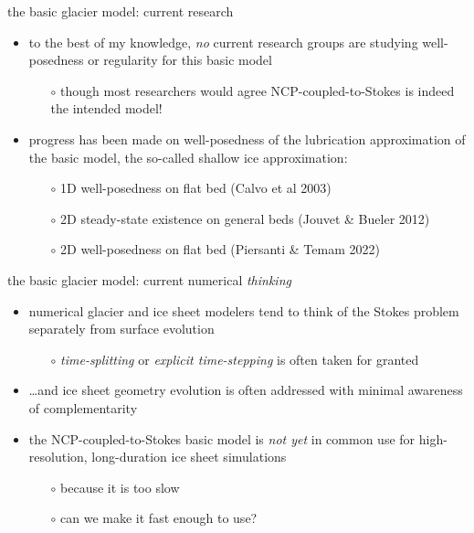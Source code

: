 \documentclass[svgnames,
               hyperref={colorlinks,citecolor=DeepPink4,linkcolor=FireBrick,urlcolor=Maroon},
               usepdftitle=false]  %
               {beamer}
\begin{document}
\begin{frame}{the basic glacier model: current research}

\begin{itemize}
\item to the best of my knowledge, \emph{no} current research groups are studying well-posedness or regularity for this basic model
    \begin{itemize}
    \item[$\circ$] though most researchers would agree NCP-coupled-to-Stokes is indeed the intended model!
    \end{itemize}

\medskip
\item<2> progress has been made on well-posedness of the lubrication approximation of the basic model, the so-called \alert{shallow ice approximation}:
    \begin{itemize}
    \item[$\circ$] 1D well-posedness on flat bed (Calvo et al 2003)
    \item[$\circ$] 2D steady-state existence on general beds (Jouvet \& Bueler 2012)
    \item[$\circ$] 2D well-posedness on flat bed (Piersanti \& Temam 2022)
    \end{itemize}
\end{itemize}
\end{frame}


\begin{frame}{the basic glacier model: current numerical \emph{thinking}}

\begin{itemize}
\item numerical glacier and ice sheet modelers tend to think of the Stokes problem separately from surface evolution
    \begin{itemize}
    \item[$\circ$] \emph{time-splitting} or \emph{explicit time-stepping} is often taken for granted
    \end{itemize}

\medskip
\item \dots and ice sheet geometry evolution is often addressed with minimal awareness of complementarity

\medskip
\item<2> the NCP-coupled-to-Stokes basic model is \emph{not yet} in common use for high-resolution, long-duration ice sheet simulations
    \begin{itemize}
    \item[$\circ$] because it is too slow
    \item[$\circ$] \alert{can we make it fast enough to use?} \hfill \begin{minipage}{0.3\textwidth}{\footnotesize {}} \end{minipage}
    \end{itemize}
\end{itemize}
\end{frame}
\end{document}
